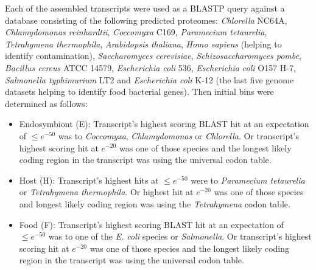 Each of the assembled transcripts were used as a BLASTP query against a database consisting of the following predicted proteomes: 
\textit{Chlorella} NC64A, \textit{Chlamydomonas reinhardtii}, \textit{Coccomyxa} C169,
\textit{Paramecium tetaurelia}, \textit{Tetrahymena thermophila}, \textit{Arabidopsis thaliana}, \textit{Homo sapiens} (helping to identify contamination), \textit{Saccharomyces cerevisiae}, \textit{Schizosaccharomyces pombe}, \textit{Bacillus
cereus} ATCC 14579, \textit{Escherichia coli} 536, \textit{Escherichia coli} O157 H-7, \textit{Salmonella typhimurium}
LT2 and \textit{Escherichia coli} K-12 (the last five genome datasets helping to identify food bacterial
genes). Then initial bins were determined as follows:
\begin{itemize}
    \item Endosymbiont (E): Transcript’s highest scoring BLAST hit at an expectation of \(\leq e^{-50}\) was to \textit{Coccomyxa},
        \textit{Chlamydomonas} or \textit{Chlorella}. Or transcript’s highest scoring hit at \(e^{-20}\) was one of those
species and the longest likely coding region in the transcript was using the universal codon
table.
\item Host (H): Transcript’s highest hits at \(\leq e^{-50}\) were to \textit{Paramecium tetaurelia} or \textit{Tetrahymena
        thermophila}. Or highest hit at \(e^{-20}\) was one of those species and longest likely coding
    region was using the \textit{Tetrahymena} codon table.
\item Food (F): Transcript’s highest scoring BLAST hit at an expectation of \(\leq e^{-50}\) was to one of the \textit{E. coli} species
    or \textit{Salmonella}. Or transcript’s highest scoring hit at \(e^{-20}\) was one of those species and
the longest likely coding region in the transcript was using the universal codon table.

\end{itemize}
